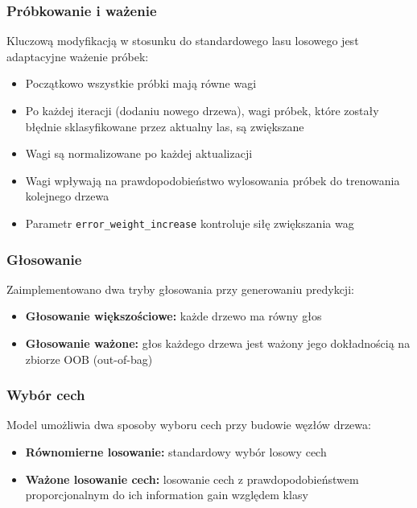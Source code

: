 \documentclass[11pt,a4paper]{article}
\begin{document}
\subsubsection{Próbkowanie i ważenie}

Kluczową modyfikacją w stosunku do standardowego lasu losowego jest adaptacyjne ważenie próbek:

\begin{itemize}
    \item Początkowo wszystkie próbki mają równe wagi
    \item Po każdej iteracji (dodaniu nowego drzewa), wagi próbek, które zostały błędnie sklasyfikowane przez aktualny las, są zwiększane
    \item Wagi są normalizowane po każdej aktualizacji
    \item Wagi wpływają na prawdopodobieństwo wylosowania próbek do trenowania kolejnego drzewa
    \item Parametr \texttt{error\_weight\_increase} kontroluje siłę zwiększania wag
\end{itemize}

\subsubsection{Głosowanie}

Zaimplementowano dwa tryby głosowania przy generowaniu predykcji:

\begin{itemize}
    \item \textbf{Głosowanie większościowe:} każde drzewo ma równy głos
    \item \textbf{Głosowanie ważone:} głos każdego drzewa jest ważony jego dokładnością na zbiorze OOB (out-of-bag)
\end{itemize}

\subsubsection{Wybór cech}

Model umożliwia dwa sposoby wyboru cech przy budowie węzłów drzewa:

\begin{itemize}
    \item \textbf{Równomierne losowanie:} standardowy wybór losowy cech
    \item \textbf{Ważone losowanie cech:} losowanie cech z prawdopodobieństwem proporcjonalnym do ich information gain względem klasy
\end{itemize}
\end{document}
